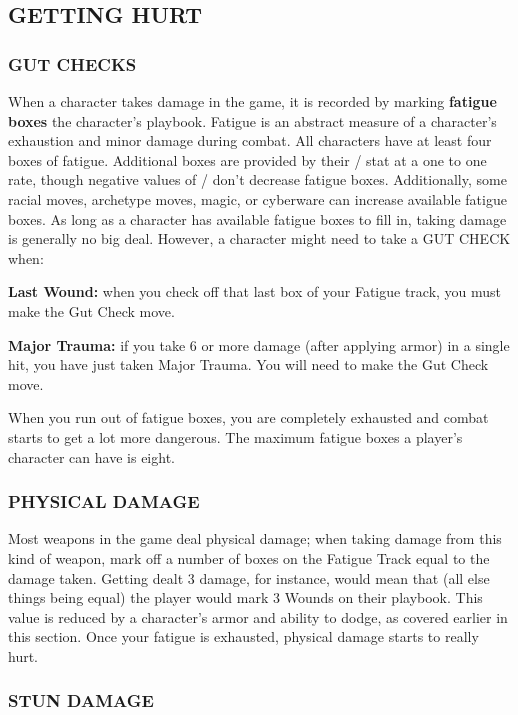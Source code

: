\documentclass[oneside,10pt]{article}
\begin{document}
\begin{multicols}{2}
\subsection{GETTING HURT}
\label{gettinghurt}

\subsubsection{GUT CHECKS}
When a character takes damage in the game, it is recorded by marking
\textbf{fatigue boxes} the character’s playbook. Fatigue is an
abstract measure of a character's exhaustion and minor damage during
combat. All characters have at least four boxes of fatigue. Additional
boxes are provided by their \oomph/ stat at a one to one rate, though
negative values of \oomph/ don't decrease fatigue boxes. Additionally,
some racial moves, archetype moves, magic, or cyberware can increase
available fatigue boxes. As long as a character has available fatigue
boxes to fill in, taking damage is generally no big deal. However, a
character might need to take a GUT CHECK when:

\begin{dent}
\textbf{Last Wound:} when you check off that last box of your
Fatigue track, you must make the Gut Check move.

\textbf{Major Trauma:} if you take 6 or more damage (after applying
armor) in a single hit, you have just taken Major Trauma. You will
need to make the Gut Check move.
\end{dent}

When you run out of fatigue boxes, you are completely exhausted and combat
starts to get a lot more dangerous. The maximum fatigue boxes a
player's character can have is eight.

\subsubsection{PHYSICAL DAMAGE}

Most weapons in the game deal physical damage; when taking damage from
this kind of weapon, mark off a number of boxes on the Fatigue Track
equal to the damage taken. Getting dealt 3 damage, for instance, would
mean that (all else things being equal) the player would mark 3 Wounds
on their playbook. This value is reduced by a character's armor and
ability to dodge, as covered earlier in this section. Once your
fatigue is exhausted, physical damage starts to really hurt.

\subsubsection{STUN DAMAGE}


\end{multicols}
\end{document}
